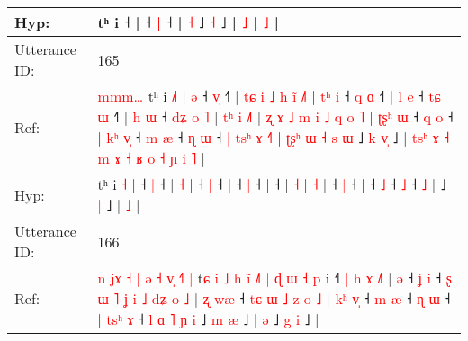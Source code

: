 \documentclass[10pt]{article}
\DeclareRobustCommand{\hl}[1]{{\textcolor{red}{#1}}}
\begin{document}
\begin{longtable}{ll}
Hyp: & \hl{}\hl{}\hl{}\hl{}\hl{}\hl{}\hl{}\hl{}\hl{}\hl{}\hl{}\hl{}\hl{}\hl{}\hl{}\hl{}\hl{}\hl{}\hl{}\hl{}\hl{}\hl{}\hl{}\hl{}\hl{}\hl{}\hl{}\hl{}\hl{}\hl{}\hl{}\hl{}tʰ i\hl{}\hl{}\hl{}\hl{}\hl{}\hl{}\hl{}\hl{}\hl{}\hl{} ˧ |\hl{}\hl{} ˧ \hl{}\hl{|} ˧\hl{} |\hl{}\hl{} \hl{˧} ˩\hl{}\hl{} \hl{}\hl{˧} ˩\hl{} |\hl{}\hl{}\hl{}\hl{} \hl{}\hl{˩} |\hl{}\hl{}\hl{}\hl{}\hl{}\hl{}\hl{}\hl{}\hl{}\hl{}\hl{} \hl{}\hl{˩} |
 \\
\midrule
Utterance ID: & 165 \\
Ref: & \hl{m}\hl{m}\hl{m}\hl{…}\hl{ }tʰ i \hl{˩}\hl{˥} |\hl{ }\hl{ə} ˧ \hl{v}\hl{̩} ˧\hl{˥} |\hl{ }\hl{t}\hl{ɕ}\hl{ }\hl{i}\hl{ }\hl{˩}\hl{ }\hl{h}\hl{ }\hl{i}\hl{̃} \hl{˩}\hl{˥} |\hl{ }\hl{t}\hl{ʰ}\hl{ }\hl{i} ˧\hl{ }\hl{q} \hl{ɑ} ˧\hl{˥} |\hl{ }\hl{l}\hl{ }\hl{e} ˧\hl{ }\hl{t}\hl{ɕ} \hl{ɯ} ˧\hl{˥} |\hl{ }\hl{h}\hl{ }\hl{ɯ} ˧\hl{ }\hl{d}\hl{ʑ}\hl{ }\hl{o}\hl{ }\hl{˥} |\hl{ }\hl{t}\hl{ʰ}\hl{ }\hl{i} \hl{˩}\hl{˥} |\hl{ }\hl{ʐ}\hl{ }\hl{ɤ}\hl{ }\hl{˩}\hl{ }\hl{m}\hl{ }\hl{i}\hl{ }\hl{˩}\hl{ }\hl{q}\hl{ }\hl{o} \hl{˥} |\hl{ }\hl{ʈ}\hl{ʂ}\hl{ʰ}\hl{ }\hl{ɯ} ˧\hl{ }\hl{q} \hl{o} ˧ |\hl{ }\hl{k}\hl{ʰ}\hl{ }\hl{v}\hl{̩} ˧\hl{ }\hl{m} \hl{æ} ˧\hl{ }\hl{ɳ} \hl{ɯ} ˧\hl{ }\hl{|}\hl{ }\hl{t}\hl{s}\hl{ʰ}\hl{ }\hl{ɤ} \hl{˧}\hl{˥} |\hl{ }\hl{ʈ}\hl{ʂ}\hl{ʰ}\hl{ }\hl{ɯ}\hl{ }\hl{˧}\hl{ }\hl{s}\hl{ }\hl{ɯ} ˩\hl{ }\hl{k} \hl{v}\hl{̩} ˩ |\hl{ }\hl{t}\hl{s}\hl{ʰ}\hl{ }\hl{ɤ}\hl{ }\hl{˧}\hl{ }\hl{m}\hl{ }\hl{ɤ}\hl{ }\hl{˧}\hl{ }\hl{ʁ}\hl{ }\hl{o}\hl{ }\hl{˧}\hl{ }\hl{ɲ}\hl{ }\hl{i} \hl{˥} |
 \\
Hyp: & \hl{}\hl{}\hl{}\hl{}\hl{}tʰ i \hl{}\hl{˧} |\hl{}\hl{} ˧ \hl{}\hl{|} ˧\hl{} |\hl{}\hl{}\hl{}\hl{}\hl{}\hl{}\hl{}\hl{}\hl{}\hl{}\hl{}\hl{} \hl{}\hl{˧} |\hl{}\hl{}\hl{}\hl{}\hl{} ˧\hl{}\hl{} \hl{|} ˧\hl{} |\hl{}\hl{}\hl{}\hl{} ˧\hl{}\hl{}\hl{} \hl{|} ˧\hl{} |\hl{}\hl{}\hl{}\hl{} ˧\hl{}\hl{}\hl{}\hl{}\hl{}\hl{}\hl{} |\hl{}\hl{}\hl{}\hl{}\hl{} \hl{}\hl{˧} |\hl{}\hl{}\hl{}\hl{}\hl{}\hl{}\hl{}\hl{}\hl{}\hl{}\hl{}\hl{}\hl{}\hl{}\hl{}\hl{} \hl{˧} |\hl{}\hl{}\hl{}\hl{}\hl{}\hl{} ˧\hl{}\hl{} \hl{|} ˧ |\hl{}\hl{}\hl{}\hl{}\hl{}\hl{} ˧\hl{}\hl{} \hl{˩} ˧\hl{}\hl{} \hl{˩} ˧\hl{}\hl{}\hl{}\hl{}\hl{}\hl{}\hl{}\hl{} \hl{}\hl{˩} |\hl{}\hl{}\hl{}\hl{}\hl{}\hl{}\hl{}\hl{}\hl{}\hl{}\hl{}\hl{} ˩\hl{}\hl{} \hl{}\hl{|} ˩ |\hl{}\hl{}\hl{}\hl{}\hl{}\hl{}\hl{}\hl{}\hl{}\hl{}\hl{}\hl{}\hl{}\hl{}\hl{}\hl{}\hl{}\hl{}\hl{}\hl{}\hl{}\hl{}\hl{}\hl{} \hl{˩} |
 \\
\midrule
Utterance ID: & 166 \\
Ref: & \hl{n}\hl{ }\hl{j}\hl{ɤ}\hl{ }\hl{˧}\hl{ }\hl{|}\hl{ }\hl{ə}\hl{ }\hl{˧}\hl{ }\hl{v}\hl{̩}\hl{ }\hl{˧}\hl{˥}\hl{ }\hl{|}\hl{ }t\hl{ɕ}\hl{ }\hl{i}\hl{ }\hl{˩}\hl{ }\hl{h}\hl{ }\hl{i}\hl{̃}\hl{ }\hl{˩}\hl{˥}\hl{ }\hl{|}\hl{ }\hl{ɖ}\hl{ }\hl{ɯ}\hl{ }\hl{˧}\hl{ }\hl{p} i ˧\hl{˥}\hl{ }\hl{|}\hl{ }\hl{h}\hl{ }\hl{ɤ}\hl{ }\hl{˩}\hl{˥} |\hl{ }\hl{ə} ˧\hl{ }\hl{ʝ} \hl{i} ˧\hl{ }\hl{ʂ}\hl{ }\hl{ɯ}\hl{ }\hl{˥}\hl{ }\hl{ʝ}\hl{ }\hl{i}\hl{ }\hl{˩}\hl{ }\hl{d}\hl{ʑ}\hl{ }\hl{o}\hl{ }\hl{˩} |\hl{ }\hl{ʐ}\hl{ }\hl{w}\hl{æ} ˧\hl{ }\hl{t}\hl{ɕ}\hl{ }\hl{ɯ}\hl{ }\hl{˩}\hl{ }\hl{z}\hl{ }\hl{o}\hl{ }\hl{˩} |\hl{ }\hl{k}\hl{ʰ}\hl{ }\hl{v}\hl{̩} ˧\hl{ }\hl{m} \hl{æ} ˧\hl{ }\hl{ɳ} \hl{ɯ} ˧ |\hl{ }\hl{t}\hl{s}\hl{ʰ}\hl{ }\hl{ɤ} ˧\hl{ }\hl{l}\hl{ }\hl{ɑ}\hl{ }\hl{˥}\hl{ }\hl{ɲ}\hl{ }\hl{i} ˩\hl{ }\hl{m} \hl{æ} ˩ |\hl{ }\hl{ə} ˩\hl{ }\hl{g} \hl{i} ˩ |

\end{longtable}
\end{document}
